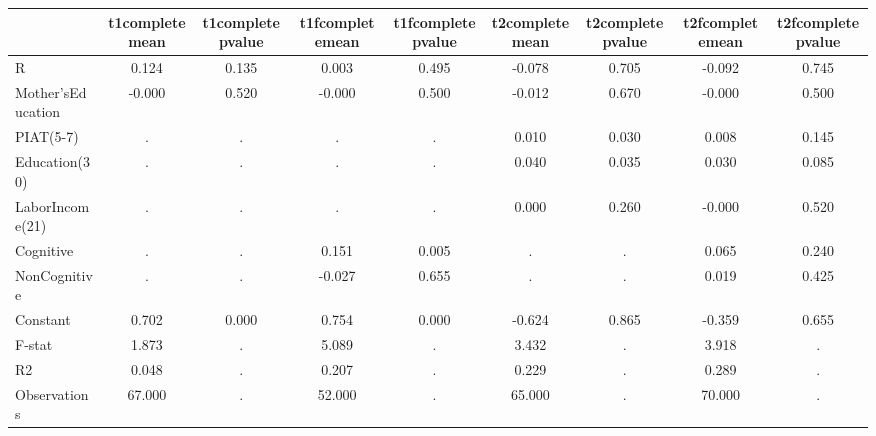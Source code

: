 \begin{table}[htbp]
\begin{tabular}{lcccccccc} \hline \hline
 & t1completemean  & t1completepvalue  & t1fcompletemean  & t1fcompletepvalue  & t2completemean  & t2completepvalue  & t2fcompletemean  & t2fcompletepvalue  \\  \hline 
R &     0.124 &     0.135 &     0.003 &     0.495 &    -0.078 &     0.705 &    -0.092 &     0.745 \\  
Mother'sEducation &    -0.000 &     0.520 &    -0.000 &     0.500 &    -0.012 &     0.670 &    -0.000 &     0.500 \\  
PIAT(5-7) &         . &         . &         . &         . &     0.010 &     0.030 &     0.008 &     0.145 \\  
Education(30) &         . &         . &         . &         . &     0.040 &     0.035 &     0.030 &     0.085 \\  
LaborIncome(21) &         . &         . &         . &         . &     0.000 &     0.260 &    -0.000 &     0.520 \\  
Cognitive &         . &         . &     0.151 &     0.005 &         . &         . &     0.065 &     0.240 \\  
NonCognitive &         . &         . &    -0.027 &     0.655 &         . &         . &     0.019 &     0.425 \\  
Constant &     0.702 &     0.000 &     0.754 &     0.000 &    -0.624 &     0.865 &    -0.359 &     0.655 \\  
F-stat &     1.873 &         . &     5.089 &         . &     3.432 &         . &     3.918 &         . \\  
R2 &     0.048 &         . &     0.207 &         . &     0.229 &         . &     0.289 &         . \\  
Observations &    67.000 &         . &    52.000 &         . &    65.000 &         . &    70.000 &         . \\  
\hline \hline \end{tabular}
\end{table}
